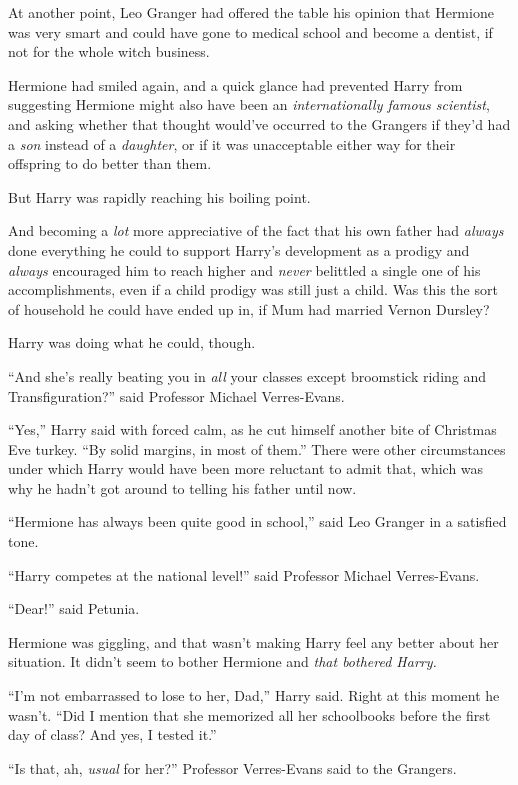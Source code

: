 At another point, Leo Granger had offered the table his opinion that Hermione was very smart and could have gone to medical school and become a dentist, if not for the whole witch business.

Hermione had smiled again, and a quick glance had prevented Harry from suggesting Hermione might also have been an \emph{internationally famous scientist}, and asking whether that thought would’ve occurred to the Grangers if they’d had a \emph{son} instead of a \emph{daughter}, or if it was unacceptable either way for their offspring to do better than them.

But Harry was rapidly reaching his boiling point.

And becoming a \emph{lot} more appreciative of the fact that his own father had \emph{always} done everything he could to support Harry’s development as a prodigy and \emph{always} encouraged him to reach higher and \emph{never} belittled a single one of his accomplishments, even if a child prodigy was still just a child. Was this the sort of household he could have ended up in, if Mum had married Vernon Dursley?

Harry was doing what he could, though.

“And she’s really beating you in \emph{all} your classes except broomstick riding and Transfiguration?” said Professor Michael Verres-Evans.

“Yes,” Harry said with forced calm, as he cut himself another bite of Christmas Eve turkey.
“By solid margins, in most of them.” There were other circumstances under which Harry would have been more reluctant to admit that, which was why he hadn’t got around to telling his father until now.

“Hermione has always been quite good in school,” said Leo Granger in a satisfied tone.

“Harry competes at the national level!” said Professor Michael Verres-Evans.

“Dear!” said Petunia.

Hermione was giggling, and that wasn’t making Harry feel any better about her situation. It didn’t seem to bother Hermione and \emph{that bothered Harry.}

“I’m not embarrassed to lose to her, Dad,” Harry said. Right at this moment he wasn’t.
“Did I mention that she memorized all her schoolbooks before the first day of class? And yes, I tested it.”

“Is that, ah, \emph{usual} for her?” Professor Verres-Evans said to the Grangers.

